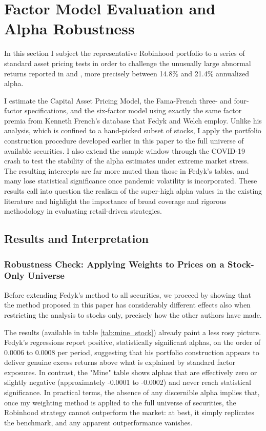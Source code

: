 \section{Factor Model Evaluation and Alpha Robustness}
\label{sec:factor_models}
In this section I subject the representative Robinhood portfolio to a series of standard asset pricing tests in order to challenge the unusually large abnormal returns reported in \cite{Fedyk2024} and \cite{Welch2022}, 
more precisely between 14.8\% and 21.4\% annualized alpha.  

I estimate the Capital Asset Pricing Model, the Fama-French three- and four-factor specifications, and the six-factor model using exactly the same factor premia from Kenneth French's database that Fedyk and Welch employ.  
Unlike his analysis, which is confined to a hand-picked subset of stocks, I apply the portfolio construction procedure developed earlier in this paper to the full universe of available securities.  
I also extend the sample window through the COVID-19 crash to test the stability of the alpha estimates under extreme market stress.  
The resulting intercepts are far more muted than those in Fedyk's tables, and many lose statistical significance once pandemic volatility is incorporated.  
These results call into question the realism of the super-high alpha values in the existing literature and highlight the importance of broad coverage and rigorous methodology in evaluating retail-driven strategies.  

\subsection{Results and Interpretation}
\subsubsection{Robustness Check: Applying Weights to Prices on a Stock-Only Universe}
Before extending Fedyk's method to all securities, we proceed by showing that the method proposed in this paper has considerably different effects also when restricting the analysis to stocks only, 
precisely how the other authors have made.

The results (available in table \ref{tab:mine_stock}) already paint a less rosy picture.
Fedyk's regressions report positive, statistically significant alphas, on the order of 0.0006 to 0.0008 per period, suggesting that his portfolio construction appears to deliver genuine excess returns above what is explained by standard factor exposures. 
In contrast, the "Mine" table shows alphas that are effectively zero or slightly negative (approximately -0.0001 to -0.0002) and never reach statistical significance. 
In practical terms, the absence of any discernible alpha implies that, once my weighting method is applied to the full universe of securities, the Robinhood strategy cannot outperform the market: at best, it simply replicates the benchmark, and any apparent outperformance vanishes.

